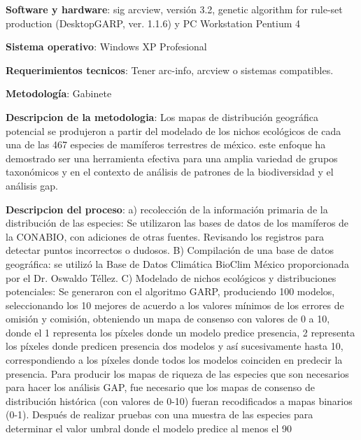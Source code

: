 \documentclass[twoside]{book}
\begin{document}
{{\textbf{Software y hardware}: sig arcview, versión 3.2, genetic algorithm for rule-set production (DesktopGARP, ver. 1.1.6) y PC Workstation Pentium 4

\textbf{Sistema operativo}: Windows XP Profesional

\textbf{Requerimientos tecnicos}: Tener arc-info, arcview o sistemas compatibles.


\textbf{Metodología}: Gabinete

\textbf{Descripcion de la metodologia}: Los mapas de distribución geográfica potencial se produjeron a partir del modelado de los nichos ecológicos de cada una de las 467 especies de mamíferos terrestres de méxico. este enfoque ha demostrado ser una herramienta efectiva para una amplia variedad de grupos taxonómicos y en el contexto de análisis de patrones de la biodiversidad y el análisis gap.

\textbf{Descripcion del proceso}: a) recolección de la información primaria de la distribución de las especies: Se utilizaron las bases de datos de los mamíferos de la CONABIO, con adiciones de otras fuentes. Revisando los registros para detectar puntos incorrectos o dudosos. B) Compilación de una base de datos geográfica: se utilizó la Base de Datos Climática BioClim México proporcionada por el Dr. Oswaldo Téllez. C) Modelado de nichos ecológicos y distribuciones potenciales: Se generaron con el algoritmo GARP, produciendo 100 modelos, seleccionando los 10 mejores de acuerdo a los valores mínimos de los errores de omisión y comisión, obteniendo un mapa de consenso con valores de 0 a 10, donde el 1 representa los píxeles donde un modelo predice presencia, 2 representa los píxeles donde predicen presencia dos modelos y así sucesivamente hasta 10, correspondiendo a los píxeles donde todos los modelos coinciden en predecir la presencia. Para producir los mapas de riqueza de las especies que son necesarios para hacer los análisis GAP, fue necesario que los mapas de consenso de distribución histórica (con valores de 0-10) fueran recodificados a mapas binarios (0-1). Después de realizar pruebas con una muestra de las especies para determinar el valor umbral donde el modelo predice al menos el 90%

}}
\end{document}
